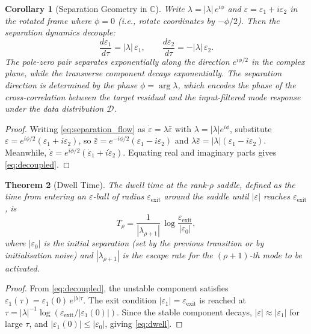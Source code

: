 \documentclass[11pt,a4paper]{article}
\newtheorem{theorem}{Theorem}[section]
\newtheorem{corollary}[theorem]{Corollary}
\theoremstyle{definition}
\newcommand{\C}{\mathbb{C}}
\newcommand{\cD}{\mathcal{D}}
\newcommand{\eps}{\varepsilon}
\begin{document}
\begin{corollary}[Separation Geometry in $\C$]\label{cor:geometry}
Write $\lambda = |\lambda|\,e^{i\phi}$ and $\eps = \eps_1 + i\eps_2$
in the rotated frame where $\phi = 0$ (i.e., rotate coordinates
by $-\phi/2$). Then the separation dynamics decouple:
\begin{equation}\label{eq:decoupled}
  \frac{d\eps_1}{d\tau} = |\lambda|\,\eps_1, \qquad
  \frac{d\eps_2}{d\tau} = -|\lambda|\,\eps_2.
\end{equation}
The pole-zero pair separates exponentially along the direction
$e^{i\phi/2}$ in the complex plane, while the transverse
component decays exponentially. The separation direction is
determined by the phase $\phi = \arg\lambda$, which encodes the
phase of the cross-correlation between the target residual and
the input-filtered mode response under the data distribution
$\cD$.
\end{corollary}

\begin{proof}
Writing \eqref{eq:separation_flow} as $\dot\eps = \lambda\bar\eps$
with $\lambda = |\lambda|e^{i\phi}$, substitute
$\eps = e^{i\phi/2}(\eps_1 + i\eps_2)$, so
$\bar\eps = e^{-i\phi/2}(\eps_1 - i\eps_2)$ and
$\lambda\bar\eps = |\lambda|(\eps_1 - i\eps_2)$.
Meanwhile, $\dot\eps = e^{i\phi/2}(\dot\eps_1 + i\dot\eps_2)$.
Equating real and imaginary parts gives \eqref{eq:decoupled}.
\end{proof}

\begin{theorem}[Dwell Time]\label{thm:dwell}
The dwell time at the rank-$\rho$ saddle, defined as the time
from entering an $\eps$-ball of radius $\eps_{\mathrm{exit}}$
around the saddle until $|\eps|$ reaches $\eps_{\mathrm{exit}}$,
is
\begin{equation}\label{eq:dwell}
  T_\rho = \frac{1}{|\lambda_{\rho+1}|}\,
  \log\frac{\eps_{\mathrm{exit}}}{|\eps_0|},
\end{equation}
where $|\eps_0|$ is the initial separation (set by the
previous transition or by initialisation noise) and
$|\lambda_{\rho+1}|$ is the escape rate for the $(\rho+1)$-th
mode to be activated.
\end{theorem}

\begin{proof}
From \eqref{eq:decoupled}, the unstable component satisfies
$\eps_1(\tau) = \eps_1(0)\, e^{|\lambda|\tau}$. The exit condition
$|\eps_1| = \eps_{\mathrm{exit}}$ is reached at
$\tau = |\lambda|^{-1}\log(\eps_{\mathrm{exit}}/|\eps_1(0)|)$.
Since the stable component decays, $|\eps| \approx |\eps_1|$ for
large $\tau$, and $|\eps_1(0)| \le |\eps_0|$, giving
\eqref{eq:dwell}.
\end{proof}
\end{document}
